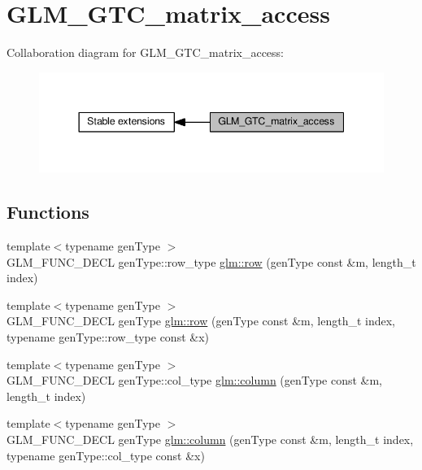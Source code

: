 \hypertarget{group__gtc__matrix__access}{}\section{G\+L\+M\+\_\+\+G\+T\+C\+\_\+matrix\+\_\+access}
\label{group__gtc__matrix__access}
Collaboration diagram for G\+L\+M\+\_\+\+G\+T\+C\+\_\+matrix\+\_\+access\+:
\nopagebreak
\begin{figure}[H]
\begin{center}
\leavevmode
\includegraphics[width=344pt]{da/da6/group__gtc__matrix__access}
\end{center}
\end{figure}
\subsection*{Functions}
\begin{DoxyCompactItemize}
\item 
{\footnotesize template$<$typename gen\+Type $>$ }\\G\+L\+M\+\_\+\+F\+U\+N\+C\+\_\+\+D\+E\+CL gen\+Type\+::row\+\_\+type \hyperlink{group__gtc__matrix__access_ga259e5ebd0f31ec3f83440f8cae7f5dba}{glm\+::row} (gen\+Type const \&m, length\+\_\+t index)
\item 
{\footnotesize template$<$typename gen\+Type $>$ }\\G\+L\+M\+\_\+\+F\+U\+N\+C\+\_\+\+D\+E\+CL gen\+Type \hyperlink{group__gtc__matrix__access_gaadcc64829aadf4103477679e48c7594f}{glm\+::row} (gen\+Type const \&m, length\+\_\+t index, typename gen\+Type\+::row\+\_\+type const \&x)
\item 
{\footnotesize template$<$typename gen\+Type $>$ }\\G\+L\+M\+\_\+\+F\+U\+N\+C\+\_\+\+D\+E\+CL gen\+Type\+::col\+\_\+type \hyperlink{group__gtc__matrix__access_ga96022eb0d3fae39d89fc7a954e59b374}{glm\+::column} (gen\+Type const \&m, length\+\_\+t index)
\item 
{\footnotesize template$<$typename gen\+Type $>$ }\\G\+L\+M\+\_\+\+F\+U\+N\+C\+\_\+\+D\+E\+CL gen\+Type \hyperlink{group__gtc__matrix__access_ga9e757377523890e8b80c5843dbe4dd15}{glm\+::column} (gen\+Type const \&m, length\+\_\+t index, typename gen\+Type\+::col\+\_\+type const \&x)
\end{DoxyCompactItemize}


